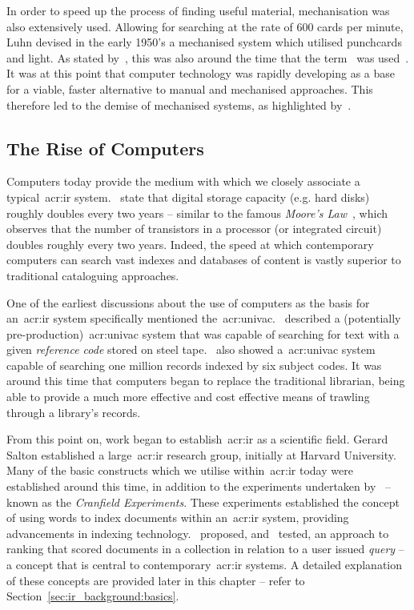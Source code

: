 In order to speed up the process of finding useful material, mechanisation was also extensively used. Allowing for searching at the rate of 600 cards per minute, Luhn devised in the early 1950's a mechanised system which utilised punchcards and light. As stated by~\cite{sanderson2012history_of_ir}, this was also around the time that the term~ was used~\citep{mooers1950theory}. It was at this point that computer technology was rapidly developing as a base for a viable, faster alternative to manual and mechanised approaches. This therefore led to the demise of mechanised systems, as highlighted by~\cite{jahoda1961electronic_searching}.

\subsection{The Rise of Computers}
Computers today provide the medium with which we closely associate a typical~\gls{acr:ir} system.~\cite{sanderson2012history_of_ir} state that digital storage capacity (e.g. hard disks) roughly doubles every two years -- similar to the famous \emph{Moore's Law}~\citep{moore1965law}, which observes that the number of transistors in a processor (or integrated circuit) doubles roughly every two years. Indeed, the speed at which contemporary computers can search vast indexes and databases of content is vastly superior to traditional cataloguing approaches.

One of the earliest discussions about the use of computers as the basis for an~\gls{acr:ir} system specifically mentioned the~\gls{acr:univac}.~\cite{holmstrom1948univac} described a (potentially pre-production)~\gls{acr:univac} system that was capable of searching for text with a given \emph{reference code} stored on steel tape.~\cite{mitchell1953univac_million} also showed a~\gls{acr:univac} system capable of searching one million records indexed by six subject codes. It was around this time that computers began to replace the traditional librarian, being able to provide a much more effective and cost effective means of trawling through a library's records.

From this point on, work began to establish~\gls{acr:ir} as a scientific field. Gerard Salton established a large~\gls{acr:ir} research group, initially at Harvard University. Many of the basic constructs which we utilise within~\gls{acr:ir} today were established around this time, in addition to the experiments undertaken by~\cite{cleverdon1962cranfield_experiments} -- known as the \emph{Cranfield Experiments}. These experiments established the concept of using words to index documents within an~\gls{acr:ir} system, providing advancements in indexing technology.~\cite{luhn1957ranking_query} proposed, and~\cite{maron1959probabilistic_indexing} tested, an approach to ranking that scored documents in a collection in relation to a user issued \emph{query} -- a concept that is central to contemporary~\gls{acr:ir} systems. A detailed explanation of these concepts are provided later in this chapter -- refer to Section~\ref{sec:ir_background:basics}.

